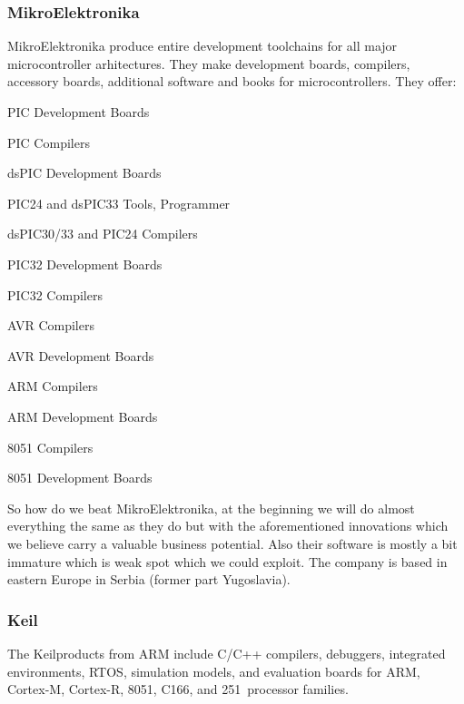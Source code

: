 \documentclass[a4paper,twoside,15pt]{book}
\begin{document}
        \subsubsection{MikroElektronika}
            MikroElektronika produce entire development toolchains for all major microcontroller arhitectures. They make development boards, compilers, accessory boards, additional software and books for microcontrollers. They offer:
            \begin{dinglist}{73}
                \item PIC Development Boards
                \item PIC Compilers
                \item dsPIC Development Boards
                \item PIC24 and dsPIC33 Tools, Programmer
                \item dsPIC30/33 and PIC24 Compilers
                \item PIC32 Development Boards
                \item PIC32 Compilers
                \item AVR Compilers
                \item AVR Development Boards
                \item ARM Compilers
                \item ARM Development Boards
                \item 8051 Compilers
                \item 8051 Development Boards
            \end{dinglist}

            So how do we beat MikroElektronika, at the beginning we will do almost everything the same as they do but with the aforementioned innovations which we believe carry a valuable business potential. Also their software is mostly a bit immature which is weak spot which we could exploit. The company is based in eastern Europe in Serbia (former part Yugoslavia).

        \subsubsection{Keil}
            The Keil\texttrademark products from ARM include C/C++ compilers, debuggers, integrated environments, RTOS, simulation models, and evaluation boards for ARM, Cortex-M, Cortex-R, 8051, C166, and 251~processor families.
\end{document}
